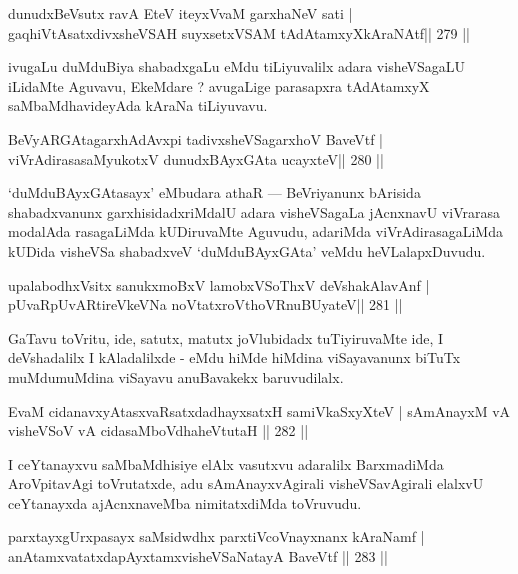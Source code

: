 \begin{shl}
dunudxBeVsutx ravA EteV iteyxVvaM garxhaNeV sati |
gaqhiVtAsatxdivxsheVSAH suyxsetxVSAM tAdAtamxyXkAraNAtf\hfill || 279 ||
\end{shl}

\begin{artha}
ivugaLu duMduBiya shabadxgaLu eMdu tiLiyuvalilx adara visheVSagaLU iLidaMte Aguvavu, EkeMdare ? avugaLige parasapxra tAdAtamxyX saMbaMdhavideyAda kAraNa tiLiyuvavu.
\end{artha}

\begin{shl}
BeVyARGAtagarxhAdAvx\s pi tadivxsheVSagarxhoV BaveVtf |
viVrAdirasasaMyukotxV dunudxBAyxGAta ucayxteV\hfill || 280 ||
\end{shl}

\begin{artha}
`duMduBAyxGAtasayx' eMbudara athaR  {\rm ---}  BeVriyanunx bArisida shabadxvanunx garxhisidadxriMdalU adara visheVSagaLa jAcnxnavU viVrarasa modalAda rasagaLiMda kUDiruvaMte Aguvudu, adariMda viVrAdirasagaLiMda kUDida visheVSa shabadxveV `duMduBAyxGAta' veMdu heVLalapxDuvudu.
\end{artha}


\begin{shl}
upalabodhxV\s sitx sanukxmoBxV lamobxVSoThxV deVshakAlavAnf |
pUvaRpUvARtireVkeVNa noVtatxroV\s thoVR\s nuBUyateV\hfill || 281 ||
\end{shl}

\begin{artha}
GaTavu toVritu, ide, satutx, matutx joVlubidadx tuTiyiruvaMte ide, I deVshadalilx I kAladalilxde - eMdu hiMde hiMdina viSayavanunx biTuTx muMdumuMdina viSayavu anuBavakekx baruvudilalx.
\end{artha}

\begin{shl}
EvaM cidanavxyAtasxvaRsatxdadhayxsatxH samiVkaSxyXteV |
sAmAnayxM vA visheVSoV vA cidasaMboVdhaheVtutaH \hfill || 282 ||
\end{shl}

\begin{artha}
I ceYtanayxvu saMbaMdhisiye elAlx vasutxvu adaralilx BarxmadiMda AroVpita\-vAgi toVrutatxde, adu sAmAnayxvAgirali visheVSavAgirali elalxvU ceYtanayxda ajAcnxnaveMba nimitatxdiMda toVruvudu.
\end{artha}

\begin{shl}
parxtayxgUrxpasayx saMsidwdhx parxtiVcoV\s nayxnanx kAraNamf |
anAtamxvatatxdapAyxtamxvisheVSaNatayA BaveVtf \hfill || 283 ||
\end{shl}

